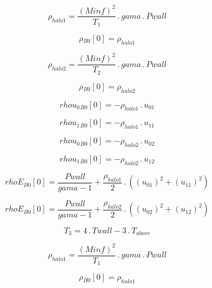 \documentclass{article}
\begin{document}
\begin{dmath}\rho_{halo 1} = \frac{\left(Minf \right)^{2}}{T_{1}} \,.\, gama \,.\, Pwall\end{dmath}

\begin{dmath}{\rho{_{B0}}}[{0}] = \rho_{halo 1}\end{dmath}

\begin{dmath}\rho_{halo 2} = \frac{\left(Minf \right)^{2}}{T_{2}} \,.\, gama \,.\, Pwall\end{dmath}

\begin{dmath}{\rho{_{B0}}}[{0}] = \rho_{halo 2}\end{dmath}

\begin{dmath}{rhou_{0}{_{B0}}}[{0}] = - \rho_{halo 1} \,.\, u_{01}\end{dmath}

\begin{dmath}{rhou_{1}{_{B0}}}[{0}] = - \rho_{halo 1} \,.\, u_{11}\end{dmath}

\begin{dmath}{rhou_{0}{_{B0}}}[{0}] = - \rho_{halo 2} \,.\, u_{02}\end{dmath}

\begin{dmath}{rhou_{1}{_{B0}}}[{0}] = - \rho_{halo 2} \,.\, u_{12}\end{dmath}

\begin{dmath}{rhoE{_{B0}}}[{0}] = \frac{Pwall}{gama - 1} + \frac{\rho_{halo 1}}{2} \,.\, \left(\left(u_{01} \right)^{2} + \left(u_{11} \right)^{2}\right)\end{dmath}

\begin{dmath}{rhoE{_{B0}}}[{0}] = \frac{Pwall}{gama - 1} + \frac{\rho_{halo 2}}{2} \,.\, \left(\left(u_{02} \right)^{2} + \left(u_{12} \right)^{2}\right)\end{dmath}

\begin{dmath}T_{3} = 4 \,.\, Twall - 3 \,.\, T_{above}\end{dmath}

\begin{dmath}\rho_{halo 1} = \frac{\left(Minf \right)^{2}}{T_{1}} \,.\, gama \,.\, Pwall\end{dmath}

\begin{dmath}{\rho{_{B0}}}[{0}] = \rho_{halo 1}\end{dmath}
\end{document}
